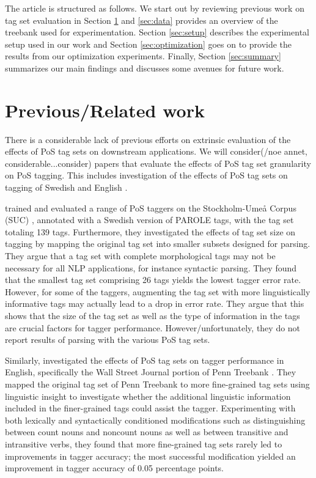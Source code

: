 \documentclass[11pt,a4paper]{article}
\begin{document}
The article is structured as follows. We start out by reviewing
previous work on tag set evaluation in Section \ref{sec:prev} and
\ref{sec:data} provides an overview of the treebank used for
experimentation. Section \ref{sec:setup} describes the experimental
setup used in our work and Section \ref{sec:optimization} goes on to
provide the results from our optimization experiments. Finally,
Section \ref{sec:summary} summarizes our main findings and discusses
some avenues for future work.

\section{Previous/Related work}
\label{sec:prev}
There is a considerable lack of previous efforts on extrinsic evaluation of the
effects of PoS tag sets on downstream applications. We will consider(/noe
annet, considerable...consider) papers that evaluate the effects of PoS tag
set granularity on PoS tagging. This includes investigation of the effects of
PoS tag sets on tagging of Swedish \cite{Meg:01,Meg:02} and English
\cite{Mac:05}.


\cite{Meg:01,Meg:02} trained and evaluated a range of PoS taggers on the
Stockholm-Umeå Corpus (SUC) \cite{Gus:Har:06}, annotated with a Swedish version
of PAROLE tags, with the tag set totaling 139 tags. Furthermore, they
investigated the effects of tag set size on tagging by mapping the original tag
set into smaller subsets designed for parsing. They argue that a tag set with
complete morphological tags may not be necessary for all NLP applications, for
instance syntactic parsing. They found that the smallest tag set comprising 26
tags yields the lowest tagger error rate. However, for some of the taggers,
augmenting the tag set with more linguistically informative tags may actually
lead to a drop in error rate. They argue that this shows that the size of the
tag set as well as the type of information in the tags are crucial factors for
tagger performance. However/unfortunately, they do not report results of parsing
with the various PoS tag sets.

Similarly,  investigated the effects of PoS tag sets on tagger
performance in English, specifically the Wall Street Journal portion of Penn
Treebank \cite{Mar:San:Mar:93}. They mapped the original tag set of Penn
Treebank to more fine-grained tag sets using linguistic insight to investigate
whether the additional linguistic information included in the finer-grained
tags could assist the tagger. Experimenting with both lexically and
syntactically conditioned modifications such as distinguishing between count
nouns and noncount nouns as well as between transitive and intransitive verbs,
they found that more fine-grained tag sets rarely led to improvements in tagger
accuracy; the most successful modification yielded an improvement in tagger
accuracy of 0.05 percentage points.
\end{document}
